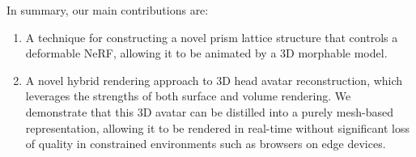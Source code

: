 In summary, our main contributions are:
\begin{enumerate}
    \item A technique for constructing a novel prism lattice structure that controls a deformable NeRF, allowing it to be animated by a 3D morphable model.
    \item A novel hybrid rendering approach to 3D head avatar reconstruction, which leverages the strengths of both surface and volume rendering. We demonstrate that this 3D avatar can be distilled into a purely mesh-based representation, allowing it to be rendered in real-time without significant loss of quality in constrained environments such as browsers on edge devices.
\end{enumerate}

